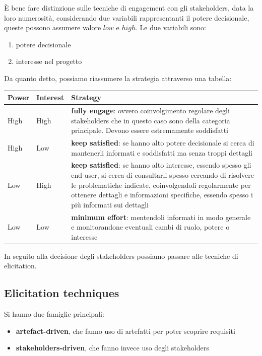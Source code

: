 È bene fare distinzione sulle tecniche di engagement con gli stakeholders, data la loro numerosità, considerando due variabili rappresentanti il potere decisionale, queste possono assumere valore $low$ e $high$. Le due variabili sono: 
\begin{enumerate}
  \item potere decisionale
  \item interesse nel progetto
\end{enumerate}
Da quanto detto, possiamo riassumere la strategia attraverso una tabella:
\begin{table}[H]
\centering
    \begin{tabular}{|p{0.1\linewidth}|p{0.1\linewidth}|p{0.8\linewidth}|}
    \hline
    \textbf{Power} &
      \textbf{Interest} &
      \textbf{Strategy} \\ \hline
    High &
      High &
      \textbf{fully engage}: ovvero coinvolgimento regolare degli stakeholders che in questo caso sono della categoria principale. Devono essere estremamente soddisfatti \\ \hline
    High &
      Low &
      \textbf{keep satisfied}: se hanno alto potere decisionale si cerca di mantenerli informati e soddisfatti ma senza troppi dettagli \\ \hline
    Low &
      High &
      \textbf{keep satisfied}: se hanno alto interesse, essendo spesso gli end-user, si cerca di consultarli spesso cercando di risolvere le problematiche indicate, coinvolgendoli regolarmente per ottenere dettagli e informazioni specifiche, essendo spesso i più informati sui dettagli \\ \hline
    Low &
      Low &
      \textbf{minimum effort}: mentendoli informati in modo generale e  monitorandone eventuali cambi di ruolo, potere o interesse \\ \hline
    \end{tabular}
\end{table}
In seguito alla decisione degli stakeholders possiamo passare alle tecniche di elicitation.

\subsection{Elicitation techniques}
Si hanno due famiglie principali:
\begin{itemize}
  \item \textbf{artefact-driven}, che fanno uso di artefatti per poter scoprire requisiti
  \item \textbf{stakeholders-driven}, che fanno invece uso degli stakeholders
\end{itemize}

